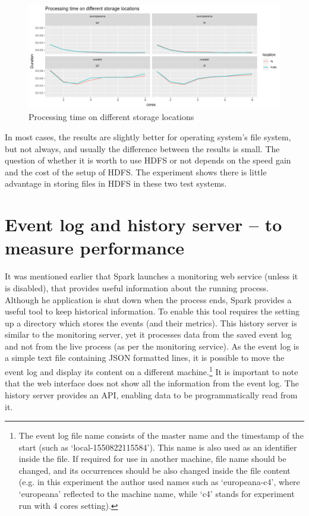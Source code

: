 \begin{figure}
\includegraphics[width=\textwidth]{images/chapter06/hdfs-vs-fs.png}
\caption{Processing time on different storage locations}
\label{hdfs-vs-fs}
\end{figure}

In most cases, the results are slightly better for operating system's file system, but not always, and usually the difference between the results is small. The question of whether it is worth to use HDFS or not depends on the speed gain and the cost of the setup of HDFS. The experiment shows there is little advantage in storing files in HDFS in these two test systems.

\section{Event log and history server -- to measure performance}

It was mentioned earlier that Spark launches a monitoring web service (unless it is disabled), that provides useful information about the running process. Although he application is shut down when the process ends, Spark provides a useful tool to keep historical information. To enable this tool requires the setting up a directory which stores the events (and their metrics). This history server is similar to the monitoring server, yet it processes data from the saved event log and not from the live process (as per the monitoring service).  As the event log is a simple text file containing JSON formatted lines, it is possible to move the event log and display its content on a different machine.\footnote{The event log file name consists of the master name and the timestamp of the start (such as `local-1550822115584'). This name is also used as an identifier inside the file. If required for use in another machine, file name should be changed, and its occurrences should be also changed inside the file content (e.g. in this experiment the author used names such as `europeana-c4', where `europeana' reflected to the machine name, while `c4' stands for experiment run with 4 cores setting).} It is important to note that the web interface does not show all the information from the event log. The history server provides an API, enabling data to be programmatically read from it.

